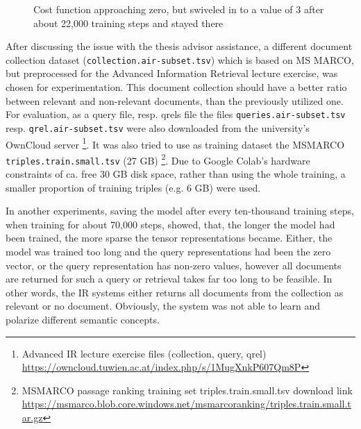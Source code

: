 \begin{figure}[htbp]
\centering
\caption[Cost function swiveling in to a value of 3]{Cost function approaching zero, but swiveled in to a value of 3 after about 22,000 training steps and stayed there} 
\label{fig:2019-12-30:cost-fn} %
\end{figure}

After discussing the issue with the thesis advisor assistance, 
    a different document collection dataset (\verb|collection.air-subset.tsv|) 
    which is based on MS MARCO, but preprocessed for the Advanced Information Retrieval 
    lecture exercise, was chosen for experimentation.
This document collection should have a better ratio between relevant and non-relevant documents,
    than the previously utilized one.
For evaluation, as a query file, resp. qrels file the files \verb|queries.air-subset.tsv| resp.
    \verb|qrel.air-subset.tsv| were also downloaded from the university's OwnCloud server 
    \footnote{Advanced IR lecture exercise files (collection, query, qrel) \url{https://owncloud.tuwien.ac.at/index.php/s/1MugXnkP607Qm8P}}.
It was also tried to use as training dataset the MSMARCO \verb|triples.train.small.tsv| (27 GB)
    \footnote{MSMARCO passage ranking training set triples.train.small.tsv download link \url{https://msmarco.blob.core.windows.net/msmarcoranking/triples.train.small.tar.gz}}.
Due to Google Colab's hardware constraints of ca. free 30 GB disk space, rather than using the whole training,
    a smaller proportion of training triples (e.g. 6 GB) were used.

In another experiments, saving the model after every ten-thousand training steps, when training for about 70,000 steps, 
    showed, that, the longer the model had been trained, the more sparse the tensor representations became.
Either, the model was trained too long and the query representations had been the zero vector,
    or the query representation has non-zero values, however all documents are returned for such a query or 
    retrieval takes far too long to be feasible.
In other words, the IR systems either returns all documents from the collection as relevant or no document.
Obviously, the system was not able to learn and polarize different semantic concepts.

